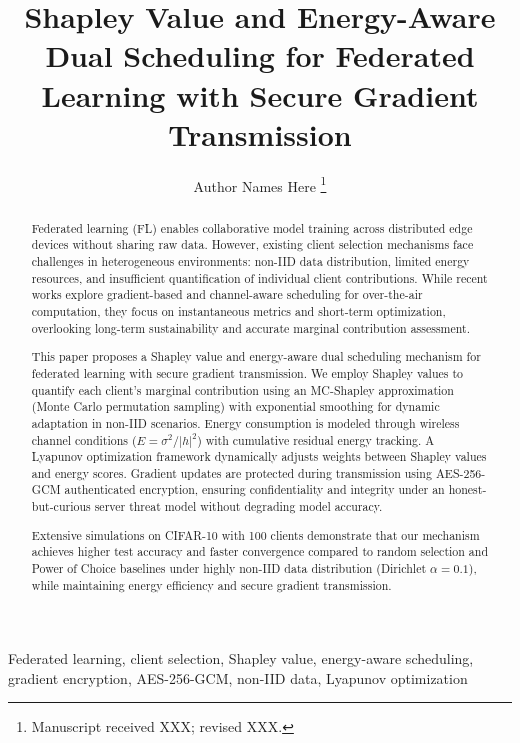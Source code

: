 \documentclass[journal]{IEEEtran}
\begin{document}
\title{Shapley Value and Energy-Aware Dual Scheduling for Federated Learning with Secure Gradient Transmission}

\author{Author Names Here
\thanks{Manuscript received XXX; revised XXX.}}

\maketitle

\begin{abstract}
Federated learning (FL) enables collaborative model training across distributed edge devices without sharing raw data. However, existing client selection mechanisms face challenges in heterogeneous environments: non-IID data distribution, limited energy resources, and insufficient quantification of individual client contributions. While recent works explore gradient-based and channel-aware scheduling for over-the-air computation, they focus on instantaneous metrics and short-term optimization, overlooking long-term sustainability and accurate marginal contribution assessment.

This paper proposes a Shapley value and energy-aware dual scheduling mechanism for federated learning with secure gradient transmission. We employ Shapley values to quantify each client's marginal contribution using an MC-Shapley approximation (Monte Carlo permutation sampling) with exponential smoothing for dynamic adaptation in non-IID scenarios. Energy consumption is modeled through wireless channel conditions ($E = \sigma^2/|h|^2$) with cumulative residual energy tracking. A Lyapunov optimization framework dynamically adjusts weights between Shapley values and energy scores. Gradient updates are protected during transmission using AES-256-GCM authenticated encryption, ensuring confidentiality and integrity under an honest-but-curious server threat model without degrading model accuracy.

Extensive simulations on CIFAR-10 with 100 clients demonstrate that our mechanism achieves higher test accuracy and faster convergence compared to random selection and Power of Choice baselines under highly non-IID data distribution (Dirichlet $\alpha=0.1$), while maintaining energy efficiency and secure gradient transmission.
\end{abstract}

\begin{IEEEkeywords}
Federated learning, client selection, Shapley value, energy-aware scheduling, gradient encryption, AES-256-GCM, non-IID data, Lyapunov optimization
\end{IEEEkeywords}











% 
% 
\end{document}
